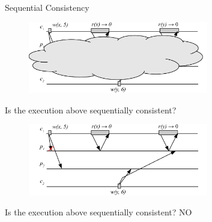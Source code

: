 \begin{frame}{Sequential Consistency}

\begin{overprint}

\begin{figure}
\includegraphics[width=0.7\textwidth]{seq-02}
\end{figure}

\begin{example}

\BIL
\item Is the execution above sequentially consistent? 
\EIL

\end{example}

\begin{figure}
\includegraphics[width=0.7\textwidth]{seq-02n}
\end{figure}

\begin{example}

\BIL
\item Is the execution above sequentially consistent? NO
\EIL

\end{example}

\end{overprint}

\end{frame}

